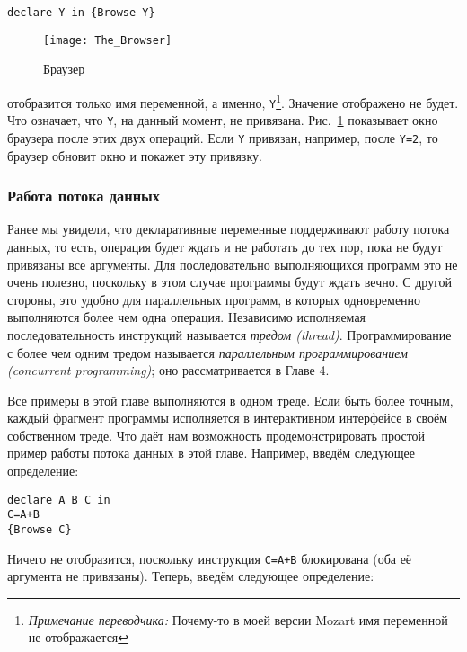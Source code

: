 \begin{lstlisting}
declare Y in {Browse Y}
\end{lstlisting}

\begin{figure}
\texttt{[image: The\_Browser]}
\caption{Браузер}
\label{figure:the_browser}
\end{figure}

отобразится только имя переменной, а именно, \lstinline|Y|\footnote{\emph{Примечание переводчика:} Почему-то в моей версии Mozart имя переменной не отображается}. Значение отображено не будет. Что означает, что \lstinline|Y|, на данный момент, не привязана. Рис.~\ref{figure:the_browser} показывает окно браузера после этих двух операций. Если \lstinline|Y| привязан, например, после \lstinline|Y=2|, то браузер обновит окно и покажет эту привязку.



\subsubsection{Работа потока данных}

Ранее мы увидели, что декларативные переменные поддерживают работу потока данных, то есть, операция будет ждать и не работать до тех пор, пока не будут привязаны все аргументы. Для последовательно выполняющихся программ это не очень полезно, поскольку в этом случае программы будут ждать вечно. С другой стороны, это удобно для параллельных программ, в которых одновременно выполняются более чем одна операция. Независимо исполняемая последовательность инструкций называется \emph{тредом (thread)}. Программирование с более чем одним тредом называется \emph{параллельным программированием (concurrent programming)}; оно рассматривается в Главе 4.

Все примеры в этой главе выполняются в одном треде. Если быть более точным, каждый фрагмент программы исполняется в интерактивном интерфейсе в своём собственном треде. Что даёт нам возможность продемонстрировать простой пример работы потока данных в этой главе. Например, введём следующее определение:

\begin{lstlisting}
declare A B C in
C=A+B
{Browse C}
\end{lstlisting}

Ничего не отобразится, поскольку инструкция \lstinline|C=A+B| блокирована (оба её аргумента не привязаны). Теперь, введём следующее определение:

